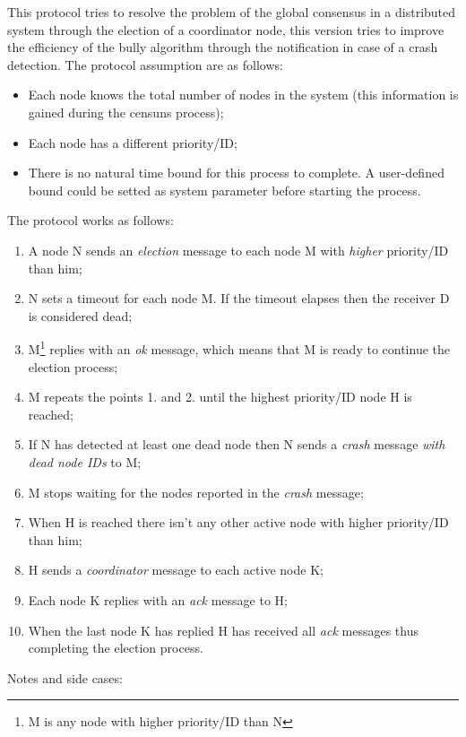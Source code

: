 This protocol tries to resolve the problem of the global consensus in a distributed system through the election
of a coordinator node, this version tries to improve the efficiency of the bully algorithm through the notification in case of a crash detection. The protocol assumption are as follows:
\begin{itemize}
  \item Each node knows the total number of nodes in the system (this information is gained during the censuns process);
  \item Each node has a different priority/ID;
  \item There is no natural time bound for this process to complete. A user-defined bound could be setted as system parameter before starting the process.
\end{itemize}
The protocol works as follows:
\begin{enumerate}
  \item A node N sends an \textit{election} message to each node M with \textit{higher} priority/ID than him;
  \item N sets a timeout for each node M. If the timeout elapses then the receiver D is considered dead;
  \item M\footnote{M is any node with higher priority/ID than N} replies with an \textit{ok} message, which means that M is ready to continue the election process;
  \item M repeats the points 1. and 2. until the highest priority/ID node H is reached;
  \item If N has detected at least one dead node then N sends a \textit{crash} message \textit{with dead node IDs} to M;
  \item M stops waiting for the nodes reported in the \textit{crash} message;
  \item When H is reached there isn't any other active node with higher priority/ID than him;
  \item H sends a \textit{coordinator} message to each active node K;
  \item Each node K replies with an \textit{ack} message to H;
  \item When the last node K has replied H has received all \textit{ack} messages thus completing the election process.
\end{enumerate}
Notes and side cases:
